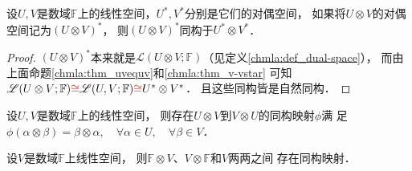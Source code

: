 \begin{proposition}\label{chmla:thm_uvs-usvs}
    设$U,V$是数域$\mathbb{F}$上的线性空间，$U^*, V^*$分别是它们的对偶空间，
    如果将$U\otimes V$的对偶空间记为$(U\otimes V)^*$，
    则$(U\otimes V)^*$同构于$U^* \otimes V^*$．
\end{proposition}
\begin{proof}
    $(U\otimes V)^*$本来就是$\mathscr{L}(U\otimes V;\mathbb{F})$（见定义\ref{chmla:def_dual-space}），
    而由上面命题\ref{chmla:thm_uvequv}和\ref{chmla:thm_v-vstar}
    可知$\mathscr{L}(U\otimes V;\mathbb{F}){\color{red}\cong}
    \mathscr{L}(U,V;\mathbb{F}){\color{red}\cong}U^* \otimes V^*$．
    且这些同构皆是自然同构．
\end{proof}

\begin{proposition}\label{chmla:thm_ab-eq-ba}
    设$U,V$是数域$\mathbb{F}$上的线性空间，
    则存在$U\otimes V$到$V\otimes U$的同构映射$\phi$满
    足$\phi(\alpha \otimes \beta) = \beta \otimes \alpha,
    \quad \forall \alpha \in U, \quad \forall \beta \in V$．
\end{proposition}
\begin{proposition}\label{chmla:thm_fv-eq-vf}
    设$V$是数域$\mathbb{F}$上线性空间，
    则$\mathbb{F}\otimes V$、$V\otimes \mathbb{F}$和$V$两两之间
    存在同构映射．
\end{proposition}
 
